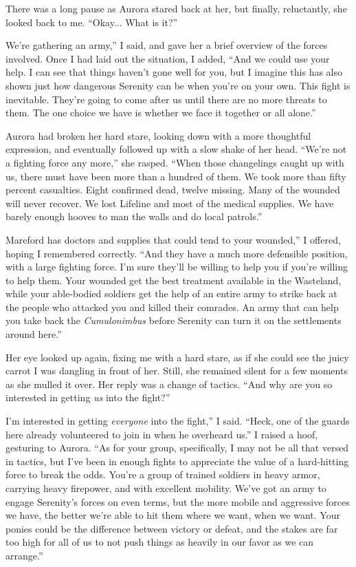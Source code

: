 There was a long pause as Aurora stared back at her, but finally, reluctantly, she looked back to me. “Okay... What is it?”

\leavevmode{}We’re gathering an army,” I said, and gave her a brief overview of the forces involved. Once I had laid out the situation, I added, “And we could use your help. I can see that things haven’t gone well for you, but I imagine this has also shown just how dangerous Serenity can be when you’re on your own. This fight is inevitable. They’re going to come after us until there are no more threats to them. The one choice we have is whether we face it together or all alone.”

Aurora had broken her hard stare, looking down with a more thoughtful expression, and eventually followed up with a slow shake of her head. “We’re not a fighting force any more,” she rasped. “When those changelings caught up with us, there must have been more than a hundred of them. We took more than fifty percent casualties. Eight confirmed dead, twelve missing. Many of the wounded will never recover. We lost Lifeline and most of the medical supplies. We have barely enough hooves to man the walls and do local patrols.”

\leavevmode{}Mareford has doctors and supplies that could tend to your wounded,” I offered, hoping I remembered correctly. “And they have a much more defensible position, with a large fighting force. I’m sure they’ll be willing to help you if you’re willing to help them. Your wounded get the best treatment available in the Wasteland, while your able-bodied soldiers get the help of an entire army to strike back at the people who attacked you and killed their comrades. An army that can help you take back the \textit{Cumulonimbus} before Serenity can turn it on the settlements around here.”

Her eye looked up again, fixing me with a hard stare, as if she could see the juicy carrot I was dangling in front of her. Still, she remained silent for a few moments as she mulled it over. Her reply was a change of tactics. “And why are you so interested in getting \textit{us} into the fight?”

\leavevmode{}I’m interested in getting \textit{everyone} into the fight,” I said. “Heck, one of the guards here already volunteered to join in when he overheard us.” I raised a hoof, gesturing to Aurora. “As for your group, specifically, I may not be all that versed in tactics, but I’ve been in enough fights to appreciate the value of a hard-hitting force to break the odds. You’re a group of trained soldiers in heavy armor, carrying heavy firepower, and with excellent mobility. We’ve got an army to engage Serenity’s forces on even terms, but the more mobile and aggressive forces we have, the better we’re able to hit them where we want, when we want. Your ponies could be the difference between victory or defeat, and the stakes are far too high for all of us to not push things as heavily in our favor as we can arrange.”

